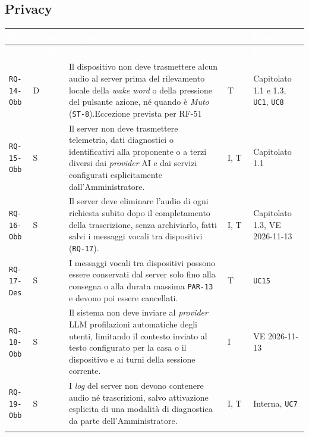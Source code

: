 \documentclass[12pt,a4paper]{article}
\newcommand{\thc}[1]{\textcolor{white}{\textbf{#1}}}
\newcommand{\rl}{\\ \arrayrulecolor{bfline}\hline}
\begin{document}
\subsection{Privacy}
\begin{longtable}{>{\raggedright\arraybackslash}p{}>{\centering\arraybackslash}p{}>{\raggedright\arraybackslash}p{}>{\centering\arraybackslash}p{}>{\raggedright\arraybackslash}p{}}
\rowcolor{bfblue}\thc{ID} & \thc{Comp.} & \thc{Requisito} & \thc{Ver.} & \thc{Fonti} \\ \endfirsthead
\rowcolor{bfblue}\thc{ID} & \thc{Comp.} & \thc{Requisito} & \thc{Ver.} & \thc{Fonti} \\ \endhead
\texttt{RQ-14-Obb} & D & Il dispositivo non deve trasmettere alcun audio al server prima del rilevamento locale della \emph{wake word} o della pressione del pulsante azione, né quando è \emph{Muto} (\texttt{ST-8}).Eccezione prevista per RF-51 & T & Capitolato 1.1 e 1.3, \texttt{UC1}, \texttt{UC8} \rl

\texttt{RQ-15-Obb} & S & Il server non deve trasmettere telemetria, dati diagnostici o identificativi alla proponente o a terzi diversi dai \emph{provider} AI e dai servizi configurati esplicitamente dall'Amministratore. & I, T & Capitolato 1.1 \rl

\texttt{RQ-16-Obb} & S & Il server deve eliminare l'audio di ogni richiesta subito dopo il completamento della trascrizione, senza archiviarlo, fatti salvi i messaggi vocali tra dispositivi (\texttt{RQ-17}). & I, T & Capitolato 1.3, VE 2026-11-13 \rl

\texttt{RQ-17-Des} & S & I messaggi vocali tra dispositivi possono essere conservati dal server solo fino alla consegna o alla durata massima \texttt{PAR-13} e devono poi essere cancellati. & T & \texttt{UC15} \rl

\texttt{RQ-18-Obb} & S & Il sistema non deve inviare al \emph{provider} LLM profilazioni automatiche degli utenti, limitando il contesto inviato al testo configurato per la casa o il dispositivo e ai turni della sessione corrente. & I & VE 2026-11-13 \rl

\texttt{RQ-19-Obb} & S & I \emph{log} del server non devono contenere audio né trascrizioni, salvo attivazione esplicita di una modalità di diagnostica da parte dell'Amministratore. & I, T & Interna, \texttt{UC7} \rl

\end{longtable}
\end{document}
